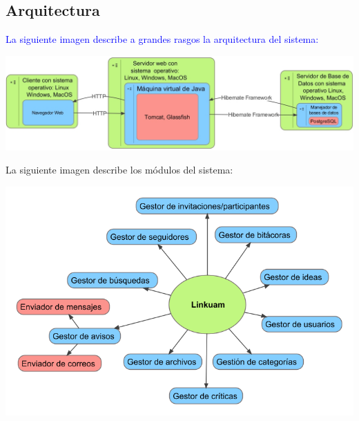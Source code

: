 \documentclass[11pt,letterpaper,titlepage]{article}
\begin{document}
\newpage
\subsection{Arquitectura}

\textcolor{blue}{La siguiente imagen describe a grandes rasgos la arquitectura del sistema:}
\begin{center} 
\includegraphics[width=440pt]{arq2.png}
\end{center}

La siguiente imagen describe los m\'odulos del sistema: 
\begin{center} 
\includegraphics[width=440pt]{arq1.png}
\end{center}
\end{document}
